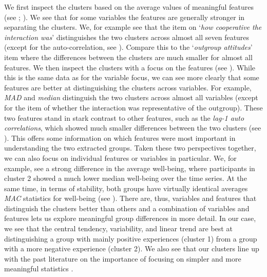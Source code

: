 We first inspect the clusters based on the average values of meaningful
features (see ; \citealp{Kennedy2021}). We
see that for some variables the features are generally stronger in
separating the clusters. We, for example see that the item on `\textit{how
cooperative the interaction was}' distinguishes the two clusters across
almost all seven features (except for the auto-correlation, see
). Compare this to the `\textit{outgroup
attitudes}' item where the differences between the clusters are much
smaller for almost all features. We then inspect the clusters with a focus
on the features (see ). While this is the
same data as for the variable focus, we can see more clearly that some
features are better at distinguishing the clusters across variables. For
example, \textit{MAD} and \textit{median} distinguish the two clusters across almost all
variables (except for the item of whether the interaction was
representative of the outgroup). These two features stand in stark
contrast to other features, such as the \textit{lag-1 auto correlations}, which
showed much smaller differences between the two clusters (see
). This offers some information on which
features were most important in understanding the two extracted
groups. Taken these two perspectives together, we can also focus on
individual features or variables in particular. We, for example, see a
strong difference in the average well-being, where participants in
cluster 2 showed a much lower median well-being over the time series. At
the same time, in terms of stability, both groups have virtually
identical averages \textit{MAC} statistics for well-being (see
). There are, thus, variables and features
that distinguish the clusters better than others and a combination of
variables and features lets us explore meaningful group differences in
more detail. In our case, we see that the central tendency, variability, and linear trend are best at distinguishing a group with mainly positive experiences (cluster 1) from a group with a more negative experience (cluster 2). We also see that our clusters line up with the past literature on the importance of focusing on simpler and more meaningful statistics \citep{bringmann2018c, eronen2021a}.

